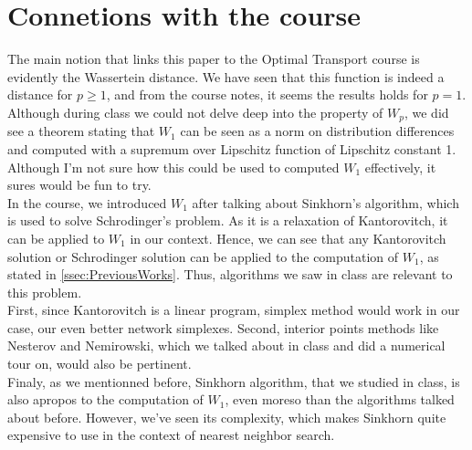 \documentclass[11pt]{article}
\begin{document}
\section{Connetions with the course}
The main notion that links this paper to the Optimal Transport course is evidently the Wassertein distance. We have seen that this function is indeed a distance for $p \geq 1$, and from the course notes, it seems the results holds for $p=1$. Although during class we could not delve deep into the property of $W_p$, we did see a theorem stating that $W_1$ can be seen as a norm on distribution differences and computed with a supremum over Lipschitz function of Lipschitz constant 1. Although I'm not sure how this could be used to computed $W_1$ effectively, it sures would be fun to try.\\

In the course, we introduced $W_1$ after talking about Sinkhorn's algorithm, which is used to solve Schrodinger's problem. As it is a relaxation of Kantorovitch, it can be applied to $W_1$ in our context. Hence, we can see that any Kantorovitch solution or Schrodinger solution can be applied to the computation of $W_1$, as stated in \ref{ssec:PreviousWorks}. Thus, algorithms we saw in class are relevant to this problem.\\
First, since Kantorovitch is a linear program, simplex method would work in our case, our even better network simplexes. Second, interior points methods like Nesterov and Nemirowski, which we talked about in class and did a numerical tour on, would also be pertinent.\\

Finaly, as we mentionned before, Sinkhorn algorithm, that we studied in class, is also apropos to the computation of $W_1$, even moreso than the algorithms talked about before. However, we've seen its complexity, which makes Sinkhorn quite expensive to use in the context of nearest neighbor search. 
\end{document}
